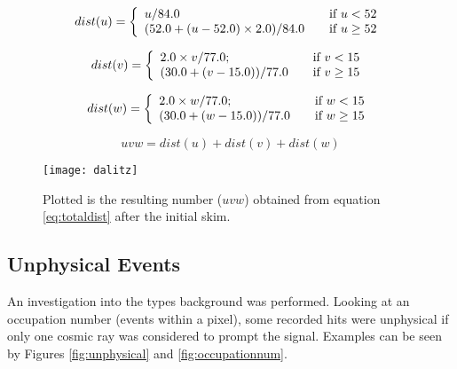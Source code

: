 \begin{equation}
    dist(u) = \left\{
        \begin{array}{l l}
            u/84.0                       & \quad \text{if $u < 52$}\\
            (52.0 + (u - 52.0)\times2.0)/84.0 & \quad \text{if $u \geq 52$}
        \end{array} \right.{}
         \label{eq:udist}
\end{equation}

\begin{equation}
    dist(v) = \left\{
        \begin{array}{l l}
            2.0 \times v/77.0;                       & \quad \text{if $v < 15$}\\
            (30.0 + (v - 15.0))/77.0                 & \quad \text{if $v \geq 15$}
        \end{array} \right.{}
         \label{eq:vdist}
\end{equation}


\begin{equation}
    dist(w) = \left\{
        \begin{array}{l l}
            2.0 \times w/77.0;                       & \quad \text{if $w < 15$}\\
            (30.0 + (w - 15.0))/77.0                 & \quad \text{if $w \geq 15$}
        \end{array} \right.{}
         \label{eq:wdist}
\end{equation}


\begin{equation} 
    uvw = dist(u) +  dist(v) + dist(w)
    \label{eq:totaldist}
\end{equation}

\begin{figure}[h]
    \centering
    \texttt{[image: dalitz]}
    \caption{Plotted is the resulting number ($uvw$) obtained from equation \ref{eq:totaldist} after the initial skim.}
    \label{fig:dalitz}
\end{figure} 


\FloatBarrier
\subsection{Unphysical Events}
\label{sec:unphysical}
An investigation into the types background was performed. 
Looking at an occupation number (events within a pixel), some recorded hits were unphysical if only one cosmic ray was considered to prompt the signal. 
Examples can be seen by Figures \ref{fig:unphysical} and \ref{fig:occupationnum}.

